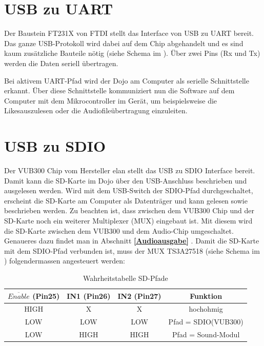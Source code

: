 \section{USB zu UART}

Der Baustein FT231X von FTDI stellt das Interface von USB zu UART bereit. Das ganze USB-Protokoll wird dabei auf dem Chip abgehandelt und es sind kaum zusätzliche Bauteile nötig (siehe Schema im ). Über zwei Pins (Rx und Tx) werden die Daten seriell übertragen.

Bei aktivem UART-Pfad wird der Dojo am Computer als serielle Schnittstelle erkannt. Über diese Schnittstelle kommuniziert nun die Software auf dem Computer mit dem Mikrocontroller im Gerät, um beispielsweise die \flq Likes\frq  auszulesen oder die Audiofileübertragung einzuleiten.


\section{USB zu SDIO}

Der VUB300 Chip vom Hersteller elan stellt das USB zu SDIO Interface bereit. Damit kann die SD-Karte im Dojo über den USB-Anschluss beschrieben und ausgelesen werden. Wird mit dem USB-Switch der SDIO-Pfad durchgeschaltet, erscheint die SD-Karte am Computer als Datenträger und kann gelesen sowie beschrieben werden. Zu beachten ist, dass zwischen dem VUB300 Chip und der SD-Karte noch ein weiterer Multiplexer (MUX) eingebaut ist. Mit diesem wird die SD-Karte zwischen dem VUB300 und dem Audio-Chip umgeschaltet. Genaueres dazu findet man in Abschnitt \textbf{\ref{Audioausgabe} }.
Damit die SD-Karte mit dem SDIO-Pfad verbunden ist, muss der MUX TS3A27518 (siehe Schema im ) folgendermassen angesteuert werden:

\begin{table}[h]
	\centering
	\begin{tabular}{|c|c|c|c|} 
		$\overline{Enable}$ (Pin25) & IN1 (Pin26) & IN2 (Pin27) & Funktion \\ 
		\hline 
		HIGH & X & X & hochohmig \\ 
		\hline 
		LOW & LOW & LOW & Pfad = SDIO(VUB300) \\ 
		\hline 
		LOW & HIGH & HIGH & Pfad = Sound-Modul \\ 
	\end{tabular} 
	\caption{Wahrheitstabelle SD-Pfade}
	\label{truth_table_sd}
\end{table}

